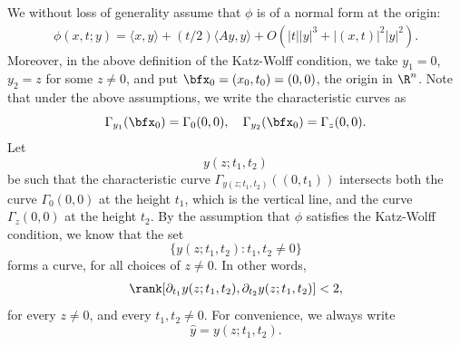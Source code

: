 \documentclass{article}
\numberwithin{equation}{section}
\theoremstyle{plain}
\begin{document}
We without loss of generality assume that $\phi$ is of a normal form at the origin: 
    \begin{align}\label{250512e_normal}
        \phi(x,t;y) = \langle x,y\rangle + (t/2)\langle Ay,y\rangle + O(|t| |y|^3 + |(x,t)|^2 |y|^2). 
    \end{align}
Moreover, in the above definition of the Katz-Wolff condition,  we take $y_1=0$, $y_2=z$ for some $z\neq 0$,
 and put $\bfx_0= (x_0,t_0)= (0,0)$, the origin in $\R^n$.
Note that under the above assumptions, we write the characteristic curves as $$
    \Gamma_{y_1}(\bfx_0)= \Gamma_{0}(0,0),\quad \Gamma_{y_2}(\bfx_0)= \Gamma_{z}(0,0).
$$ 
Let 
\begin{equation}
    y(z; t_1, t_2)
\end{equation}
be such that the characteristic curve $\Gamma_{y(z; t_1, t_2)}((0, t_1))$ intersects both the curve $\Gamma_{0}(0,0)$ at the height $t_1$, which is the vertical line, and the curve $\Gamma_{z}(0,0)$ at the height $t_2$. By the assumption that $\phi$ satisfies the Katz-Wolff condition, we know that the set
\begin{equation}
\{y(z; t_1, t_2): t_1, t_2\neq 0\}
\end{equation}
forms a curve, for all choices of $z\neq 0$.  In other words, 
    \begin{align}\label{eq: expr 1}
        \rank[\partial_{t_1} y(z; t_1, t_2), \partial_{t_2} y(z; t_1, t_2)] < 2,
    \end{align}
    for every $z\neq 0$, and every  $t_1, t_2\neq 0$. For convenience, we always write
    \begin{equation}
        \hat{y}=y(z; t_1, t_2).
    \end{equation}
\end{document}
